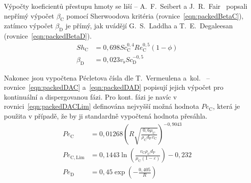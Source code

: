 Výpočty koeficientů přestupu hmoty se liší -- A.~F.~Seibert a J.~R.~Fair~\cite{Seibert1988} popsali nepřímý výpočet $\beta_\mathrm{C}$ pomocí Sherwoodova kritéria (rovnice~\ref{eqn:packedBetaC}), zatímco výpočet $\beta_\mathrm{D}$ je přímý, jak uvádějí G.~S.~Laddha a T.~E.~Degaleesan~\cite{Laddha1978} (rovnice~\ref{eqn:packedBetaD}).
\begin{align}
\label{eqn:packedBetaC}
	Sh_\mathrm{C} &= 0,698 Sc_\mathrm{C}^{0,4} Re_\mathrm{C}^{0,5} (1-\phi) \\
\label{eqn:packedBetaD}
	\beta_\mathrm{D} &= 0,023 v_\mathrm{s} Sc_\mathrm{D}^{-0,5}
\end{align}

Nakonec jsou vypočtena Pécletova čísla dle T.~Vermeulena a~kol.~\cite{Vermeulen1966} -- rovnice~\ref{eqn:packedDAC} a~\ref{eqn:packedDAD} popisují jejich výpočet pro kontinuální a dispergovanou fázi.
Pro kont. fázi je navíc v rovnici~\ref{eqn:packedDACLim} definována nejvyšší možná hodnota $Pe_\mathrm{C}$, která je použita v případě, že by ji standardně vypočtená hodnota přesáhla.
\begin{align}
\label{eqn:packedDAC}
	Pe_\mathrm{C} &= 0,01268 \left( R \sqrt{ \frac{ 0,6 \mu_\mathrm{C} }{ \rho_\mathrm{C} d_\mathrm{P} v_\mathrm{C} } } \right)^{-0,9043} \\
\label{eqn:packedDACLim}
	Pe_\mathrm{C, Lim} &= 0,1443 \ln \left( \frac{ v_\mathrm{C} \rho_\mathrm{C} d_\mathrm{P} }{ \mu_\mathrm{C} (1-\varepsilon) } \right) - 0,232 \\
\label{eqn:packedDAD}
	Pe_\mathrm{D} &= 0,45 \exp \left( - \frac{0,405}{R} \right)
\end{align}




